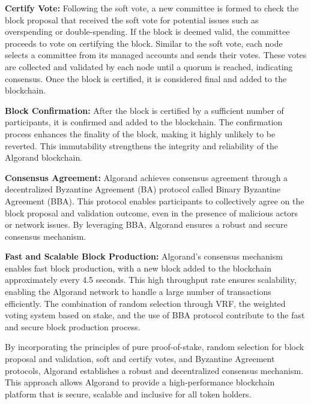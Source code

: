 \textbf{Certify Vote:}
Following the soft vote, a new committee is formed to check the block proposal that received the soft vote for potential issues such as overspending or double-spending. If the block is deemed valid, the committee proceeds to vote on certifying the block. Similar to the soft vote, each node selects a committee from its managed accounts and sends their votes. These votes are collected and validated by each node until a quorum is reached, indicating consensus. Once the block is certified, it is considered final and added to the blockchain.\newline

\textbf{Block Confirmation:}
After the block is certified by a sufficient number of participants, it is confirmed and added to the blockchain. The confirmation process enhances the finality of the block, making it highly unlikely to be reverted. This immutability strengthens the integrity and reliability of the Algorand blockchain.\newline

\textbf{Consensus Agreement:}
Algorand achieves consensus agreement through a decentralized Byzantine Agreement (BA) protocol called Binary Byzantine Agreement (BBA). This protocol enables participants to collectively agree on the block proposal and validation outcome, even in the presence of malicious actors or network issues. By leveraging BBA, Algorand ensures a robust and secure consensus mechanism.\newline

\textbf{Fast and Scalable Block Production:}
Algorand's consensus mechanism enables fast block production, with a new block added to the blockchain approximately every 4.5 seconds. This high throughput rate ensures scalability, enabling the Algorand network to handle a large number of transactions efficiently. The combination of random selection through VRF, the weighted voting system based on stake, and the use of BBA protocol contribute to the fast and secure block production process.\newline

By incorporating the principles of pure proof-of-stake, random selection for block proposal and validation, soft and certify votes, and Byzantine Agreement protocols, Algorand establishes a robust and decentralized consensus mechanism. This approach allows Algorand to provide a high-performance blockchain platform that is secure, scalable and inclusive for all token holders.\newline

